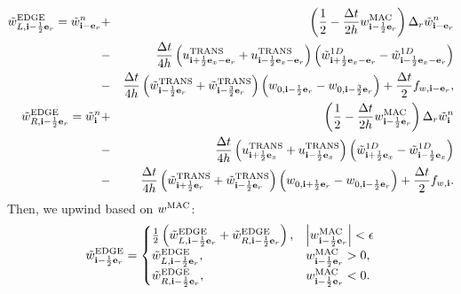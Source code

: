 \begin{eqnarray}
\tilde{w}_{L,{\bf i}-\frac{1}{2}{\bf e}_r}^{\rm EDGE} = \tilde{w}_{{\bf i}-{\bf e}_r}^n &+& \left(\frac{1}{2} - \frac{\Delta t}{2h}w_{{\bf i}-\frac{1}{2}{\bf e}_r}^{\rm MAC}\right)\Delta_r \tilde{w}_{{\bf i}-{\bf e}_r}^n \nonumber \\
&-& \frac{\Delta t}{4h}\left(u_{{\bf i}+\frac{1}{2}{\bf e}_x-{\bf e}_r}^{\rm TRANS}+u_{{\bf i}-\frac{1}{2}{\bf e}_x-{\bf e}_r}^{\rm TRANS}\right)\left(\tilde{w}_{{\bf i}+\frac{1}{2}{\bf e}_x-{\bf e}_r}^{1D} - \tilde{w}_{{\bf i}-\frac{1}{2}{\bf e}_x-{\bf e}_r}^{1D}\right) \nonumber \\
&-& \frac{\Delta t}{4h}\left(\tilde{w}_{{\bf i}-\frac{1}{2}{\bf e}_r}^{\rm TRANS}+\tilde{w}_{{\bf i}-\frac{3}{2}{\bf e}_r}^{\rm TRANS}\right)\left(w_{0,{\bf i}-\frac{1}{2}{\bf e}_r}-w_{0,{\bf i}-\frac{3}{2}{\bf e}_r}\right) + \frac{\Delta t}{2}f_{w,{\bf i}-{\bf e}_r}, \label{wt_L r-edge} \\
\tilde{w}_{R,{\bf i}-\frac{1}{2}{\bf e}_r}^{\rm EDGE} = \tilde{w}_{{\bf i}}^n &+& \left(\frac{1}{2} - \frac{\Delta t}{2h}w_{{\bf i}-\frac{1}{2}{\bf e}_r}^{\rm MAC}\right)\Delta_r \tilde{w}_{{\bf i}}^n \nonumber \\
&-& \frac{\Delta t}{4h}\left(u_{{\bf i}+\frac{1}{2}{\bf e}_x}^{\rm TRANS}+u_{{\bf i}-\frac{1}{2}{\bf e}_x}^{\rm TRANS}\right)\left(\tilde{w}_{{\bf i}+\frac{1}{2}{\bf e}_x}^{1D} - \tilde{w}_{{\bf i}-\frac{1}{2}{\bf e}_x}^{1D}\right) \nonumber \\
&-& \frac{\Delta t}{4h}\left(\tilde{w}_{{\bf i}+\frac{1}{2}{\bf e}_r}^{\rm TRANS}+\tilde{w}_{{\bf i}-\frac{1}{2}{\bf e}_r}^{\rm TRANS}\right)\left(w_{0,{\bf i}+\frac{1}{2}{\bf e}_r}-w_{0,{\bf i}-\frac{1}{2}{\bf e}_r}\right) + \frac{\Delta t}{2}f_{w,{\bf i}}. \label{wt_R r-edge}
\end{eqnarray}
Then, we upwind based on $w^{\rm MAC}$:
\begin{equation}
\tilde{w}_{{\bf i}-\frac{1}{2}{\bf e}_r}^{\rm EDGE} =
\begin{cases}
\frac{1}{2}\left(\tilde{w}_{L,{\bf i}-\frac{1}{2}{\bf e}_r}^{\rm EDGE} + \tilde{w}_{R,{\bf i}-\frac{1}{2}{\bf e}_r}^{\rm EDGE}\right), & \left|w^{\rm MAC}_{{\bf i}-\frac{1}{2}{\bf e}_r}\right| < \epsilon \\
\tilde{w}_{L,{\bf i}-\frac{1}{2}{\bf e}_r}^{\rm EDGE}, & w^{\rm MAC}_{{\bf i}-\frac{1}{2}{\bf e}_r} > 0, \\
\tilde{w}_{R,{\bf i}-\frac{1}{2}{\bf e}_r}^{\rm EDGE}, & w^{\rm MAC}_{{\bf i}-\frac{1}{2}{\bf e}_r} < 0.
\end{cases}
\end{equation}

\cleardoublepage

